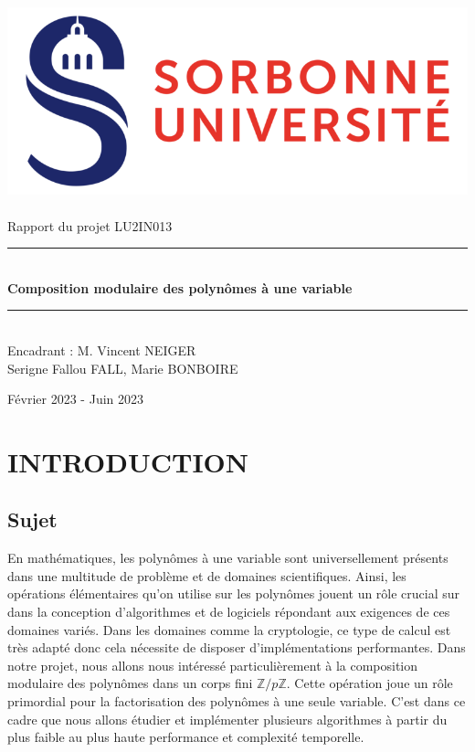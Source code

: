 \documentclass[a4paper]{article}
\begin{document}
\thispagestyle{plain}

\begin{titlepage}
    \begin{center}

        \bigskip
        \includegraphics[scale=0.5]{logo_su.jpg}~\\[4cm]

        {\LARGE Rapport du projet LU2IN013}\\[0.3cm]
        \rule{\linewidth}{0.5mm} \\[0.6cm]
        {\huge \textbf{Composition modulaire des polynômes à une variable}}\\[0.4cm]
        \rule{\linewidth}{0.5mm} \\[1cm]
        {\large Encadrant : M. Vincent NEIGER}\\[5cm]

        {\Large Serigne Fallou FALL, Marie BONBOIRE}
        
        \vfill
        Février 2023 - Juin 2023


    \end{center}
\end{titlepage}

\newpage

\tableofcontents

\newpage


\section{INTRODUCTION}

\subsection{Sujet}

En mathématiques, les polynômes à une variable sont universellement présents dans une multitude de problème et de domaines scientifiques. Ainsi, les opérations élémentaires qu'on utilise sur les polynômes jouent un rôle crucial sur dans la conception d'algorithmes et de logiciels répondant aux exigences de ces domaines variés. Dans les domaines comme la cryptologie, ce type de calcul est très adapté donc cela nécessite de disposer d'implémentations performantes. Dans notre projet, nous allons nous intéressé particulièrement à la composition modulaire des polynômes dans un corps fini ${\mathbb{Z}/p \mathbb{Z}}$. Cette opération joue un rôle primordial pour la factorisation des polynômes à une seule variable. C'est dans ce cadre que nous allons étudier et implémenter plusieurs algorithmes à partir du plus faible au plus haute performance et complexité temporelle.
\end{document}
